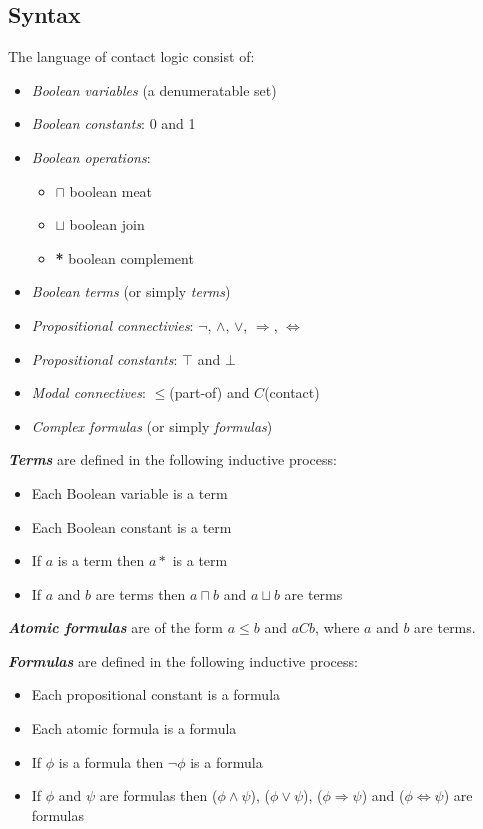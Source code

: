 \documentclass{article}
\begin{document}
	\subsection{Syntax}
	The language of contact logic consist of:
	\begin{itemize}
		\item \textit{Boolean variables} (a denumeratable set)
		\item \textit{Boolean constants}: 0 and 1
		\item \textit{Boolean operations}:
		\begin{itemize}
			\item $\sqcap$ boolean meat
			\item $\sqcup$ boolean join
			\item \textbf{*} boolean complement
		\end{itemize}
		\item \textit{Boolean terms} (or simply \textit{terms})
		\item \textit{Propositional connectivies}: $\neg$, $\land$, $\lor$, $\Rightarrow$, $\Leftrightarrow$
		\item \textit{Propositional constants}: $\top$ and $\bot$
		\item \textit{Modal connectives}: $\leq$(part-of) and $C$(contact)
		\item \textit{Complex formulas} (or simply \textit{formulas})
	\end{itemize}

	\noindent\textbf{\textit{Terms}} are defined in the following inductive process:
	\begin{itemize}
		\item Each Boolean variable is a term
		\item Each Boolean constant is a term
		\item If $a$ is a term then $a*$ is a term
		\item If $a$ and $b$ are terms then $a \sqcap b$ and $a \sqcup b$ are terms
	\end{itemize}

	\noindent\textbf{\textit{Atomic formulas}} are of the form $a \leq b$ and $aCb$, where $a$ and $b$ are terms.

	\noindent\textbf{\textit{Formulas}} are defined in the following inductive process:
	\begin{itemize}
		\item Each propositional constant is a formula
		\item Each atomic formula is a formula
		\item If $\phi$ is a formula then $\neg\phi$ is a formula
		\item If $\phi$ and $\psi$ are formulas then ($\phi \land \psi$), ($\phi \lor \psi$), ($\phi \Rightarrow \psi$) and ($\phi \Leftrightarrow \psi$) are formulas
	\end{itemize}
\end{document}
